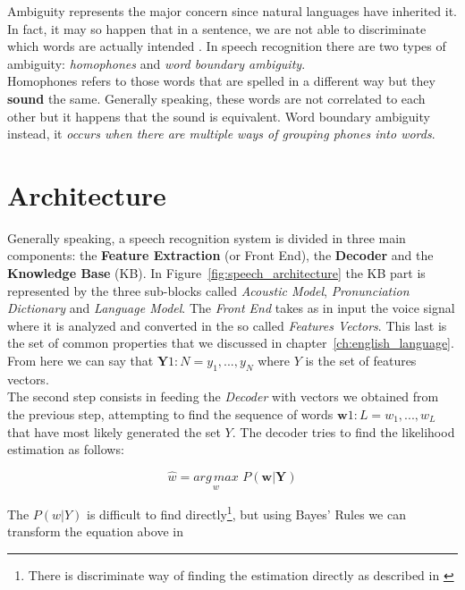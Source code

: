 \noindent Ambiguity represents the major concern since natural languages have inherited it. In fact, it may so happen that in a sentence, we are not able to discriminate which words are actually intended \cite{forsberg2003speech}. In speech recognition there are two types of ambiguity: \textit{homophones} and \textit{word boundary ambiguity}. \\
Homophones refers to those words that are spelled in a different way but they \textbf{sound} the same. Generally speaking, these words are not correlated to each other but it happens that the sound is equivalent. Word boundary ambiguity instead, it \textit{occurs when there are multiple ways of grouping phones into words}\cite{forsberg2003speech}.

\section{Architecture}
\label{sec:speech_rec_Architecture}
Generally speaking, a speech recognition system is divided in three main components: the \textbf{Feature Extraction} (or Front End), the \textbf{Decoder} and the \textbf{Knowledge Base} (KB). In Figure~\ref{fig:speech_architecture} the KB part is represented by the three sub-blocks called \textit{Acoustic Model}, \textit{Pronunciation Dictionary} and \textit{Language Model}. The \textit{Front End} takes as in input the voice signal where it is analyzed and converted in the so called \textit{Features Vectors}. This last is the set of common properties that we discussed in chapter~\ref{ch:english_language}. From here we can say that $\textbf{Y} 1:N = y_{1},..., y_{N}$ where $Y$ is the set of features vectors. \\
The second step consists in feeding the \textit{Decoder} with vectors we obtained from the previous step, attempting to find the sequence of words $\textbf{w} 1:L = w_{1}, ... , w_{L}$ that have most likely generated the set $Y$\cite{gales2008application}. The decoder tries to find the likelihood estimation as follows:

\begin{equation}
	\widehat{w} = \underset{w}{arg \, max} \,\, P(\textbf{w}| \textbf{Y})
\end{equation}

\noindent The $P (w|Y)$ is difficult to find directly\footnote{There is discriminate way of finding the estimation directly as described in \cite{gales2007discriminative}}, but using Bayes' Rules we can transform the equation above in

